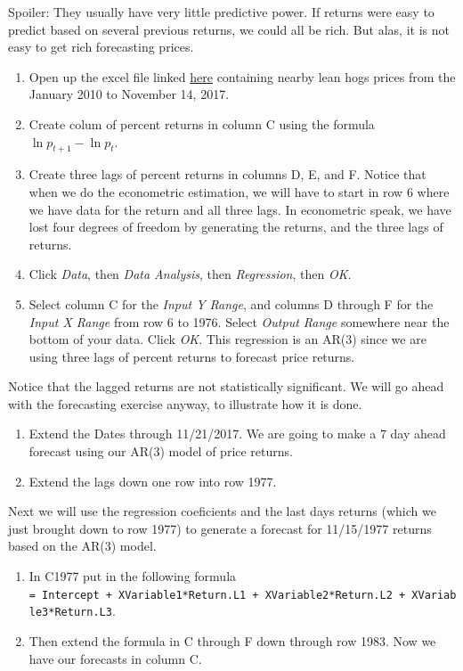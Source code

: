 \documentclass[
  letterpaper,
  DIV=11,
  numbers=noendperiod]{scrreprt}
\begin{document}
Spoiler: They usually have very little predictive power. If returns were
easy to predict based on several previous returns, we could all be rich.
But alas, it is not easy to get rich forecasting prices.

\begin{enumerate}
\def\labelenumi{\arabic{enumi}.}
\item
  Open up the excel file linked \href{Excel-files/LeanHogs.xlsx}{here}
  containing nearby lean hogs prices from the January 2010 to November
  14, 2017.
\item
  Create colum of percent returns in column C using the formula
  \(\ln{p_{t+1}} - \ln{p_{t}}\).
\item
  Create three lags of percent returns in columns D, E, and F. Notice
  that when we do the econometric estimation, we will have to start in
  row 6 where we have data for the return and all three lags. In
  econometric speak, we have lost four degrees of freedom by generating
  the returns, and the three lags of returns.
\item
  Click \emph{Data}, then \emph{Data Analysis}, then \emph{Regression},
  then \emph{OK}.
\item
  Select column C for the \emph{Input Y Range}, and columns D through F
  for the \emph{Input X Range} from row 6 to 1976. Select \emph{Output
  Range} somewhere near the bottom of your data. Click \emph{OK}. This
  regression is an AR(3) since we are using three lags of percent
  returns to forecast price returns.
\end{enumerate}

Notice that the lagged returns are not statistically significant. We
will go ahead with the forecasting exercise anyway, to illustrate how it
is done.

\begin{enumerate}
\def\labelenumi{\arabic{enumi}.}
\setcounter{enumi}{5}
\item
  Extend the Dates through 11/21/2017. We are going to make a 7 day
  ahead forecast using our AR(3) model of price returns.
\item
  Extend the lags down one row into row 1977.
\end{enumerate}

Next we will use the regression coeficients and the last days returns
(which we just brought down to row 1977) to generate a forecast for
11/15/1977 returns based on the AR(3) model.

\begin{enumerate}
\def\labelenumi{\arabic{enumi}.}
\setcounter{enumi}{7}
\item
  In C1977 put in the following formula
  \texttt{=\ Intercept\ +\ XVariable1*Return.L1\ +\ XVariable2*Return.L2\ +\ XVariable3*Return.L3}.
\item
  Then extend the formula in C through F down through row 1983. Now we
  have our forecasts in column C.
\end{enumerate}
\end{document}

